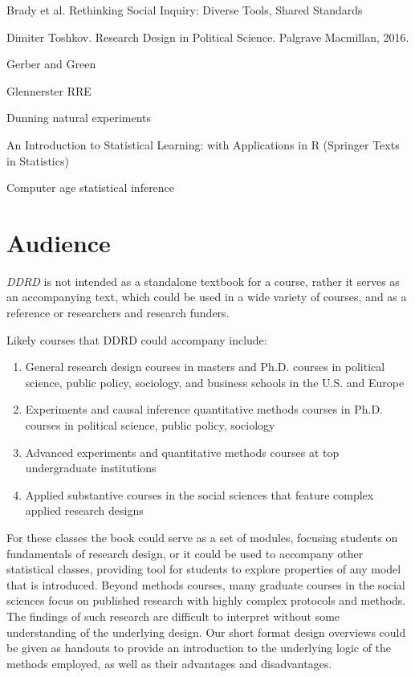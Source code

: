 \documentclass[11pt]{article}
\begin{document}
Brady et al. Rethinking Social Inquiry: Diverse Tools, Shared Standards

Dimiter Toshkov. Research Design in Political Science. Palgrave Macmillan, 2016.

Gerber and Green

Glennerster RRE

Dunning natural experiments

An Introduction to Statistical Learning: with Applications in R (Springer Texts in Statistics)

Computer age statistical inference

\section{Audience}

\textit{DDRD} is not intended as a standalone textbook for a course, rather it serves as an accompanying text, which could be used in a wide variety of courses, and as a reference or researchers and research funders. 

Likely courses that DDRD could accompany include:

\begin{enumerate}
\item General research design courses in masters and Ph.D. courses in political science, public policy, sociology, and business schools in the U.S. and Europe

\item Experiments and causal inference quantitative methods courses in Ph.D. courses in political science, public policy, sociology

\item Advanced experiments and quantitative methods courses at top undergraduate institutions

\item Applied substantive courses in the social sciences that feature complex applied research designs
\end{enumerate}

For these classes the book could serve as a set of modules, focusing students on fundamentals of research design, or it could be used to accompany other statistical classes, providing tool for students to explore properties of any model that is introduced. Beyond methods courses, many graduate courses in the social sciences focus on published research with highly complex protocols and methods. The findings of such research are difficult to interpret without some understanding of the underlying design. Our short format design overviews could be given as handouts to provide an introduction to the underlying logic of the methods employed, as well as their advantages and disadvantages. 
\end{document}

